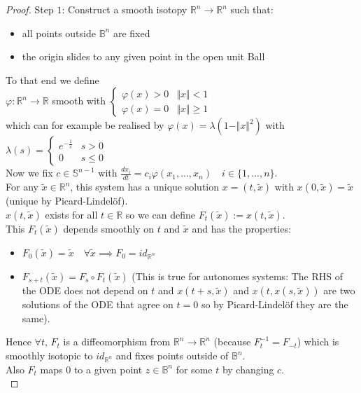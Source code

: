 \begin{proof}
    Step $1$: Construct a smooth isotopy $\mathbb{R}^n\to\mathbb{R}^n$ such that:
    \begin{itemize}
        \item all points outside $\mathbb{B}^n$ are fixed
        \item the origin slides to any given point in the open unit Ball
    \end{itemize}
    To that end we define\\
     $\varphi:\mathbb{R}^n\to\mathbb{R}$ smooth with $\begin{cases}
        \varphi(x)>0 & \Vert x\Vert<1\\
        \varphi(x)=0 & \Vert x\Vert \geq 1
    \end{cases}$\\
    which can for example be realised by $\varphi(x)=\lambda(1-\Vert x\Vert^2)$ with \\
    $\lambda(s)=\begin{cases}
        e^{-\frac{1}{s}} & s>0\\
        0 & s \leq 0
    \end{cases}$\\
    Now we fix $c\in\mathbb{S}^{n-1}$ with $\frac{dx_i}{dt}=c_i\varphi(x_1,...,x_n)\quad i\in\{1,...,n\}$.\\
    For any $\tilde x\in\mathbb{R}^n$, this system has a unique solution $x=(t,\tilde x)$ with $x(0,\tilde x)=\tilde x$ (unique by Picard-Lindelöf).\\
    $x(t,\tilde x)$ exists for all $t\in\mathbb{R}$ so we can define $F_t(\tilde x):=x(t,\tilde x)$.\\
    This $F_t(\tilde x)$ depends smoothly on $t$ and $\tilde x$ and has the properties:
    \begin{itemize}
        \item $F_0(\tilde x)=\tilde x\quad \forall \tilde x\implies F_0=id_{\mathbb{R}^n}$
        \item $F_{s+t}(\tilde x)=F_s\circ F_t(\tilde x)$ (This is true for autonomes systems: The RHS of the ODE does not depend on $t$ and $x(t+s,\tilde x)$ and $x(t,x(s,\tilde x))$ are two solutions of the ODE that agree on $t=0$ so by Picard-Lindelöf they are the same).\\
    
    \end{itemize}
    Hence $\forall t$, $F_t$ is a diffeomorphism from $\mathbb{R}^n\to\mathbb{R}^n$ (because $F_t^{-1}=F_{-t}$) which is smoothly isotopic to $id_{\mathbb{R}^n}$ and fixes points outside of $\mathbb{B}^n$.\\
    Also $F_t$ maps $0$ to a given point $z\in\mathbb{B}^n$ for some $t$ by changing $c$.\\


\end{proof}
